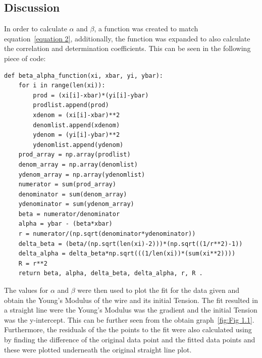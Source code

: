 \documentclass[12pt, a4paper]{article}
\begin{document}
\subsection{Discussion}
In order to calculate \(\alpha\) and \(\beta\), a function was created to match equation~\ref{equation 2}, additionally, the function was expanded to also calculate the correlation and determination coefficients. This can be seen in the following piece of code:
\begin{verbatim}
def beta_alpha_function(xi, xbar, yi, ybar):
    for i in range(len(xi)):
        prod = (xi[i]-xbar)*(yi[i]-ybar)
        prodlist.append(prod)
        xdenom = (xi[i]-xbar)**2
        denomlist.append(xdenom)
        ydenom = (yi[i]-ybar)**2
        ydenomlist.append(ydenom)
    prod_array = np.array(prodlist)
    denom_array = np.array(denomlist)
    ydenom_array = np.array(ydenomlist)
    numerator = sum(prod_array)
    denominator = sum(denom_array)
    ydenominator = sum(ydenom_array)
    beta = numerator/denominator
    alpha = ybar - (beta*xbar)
    r = numerator/(np.sqrt(denominator*ydenominator))
    delta_beta = (beta/(np.sqrt(len(xi)-2)))*(np.sqrt((1/r**2)-1))
    delta_alpha = delta_beta*np.sqrt(((1/len(xi))*(sum(xi**2))))
    R = r**2
    return beta, alpha, delta_beta, delta_alpha, r, R .
\end{verbatim}
The values for \(\alpha\) and \(\beta\) were then used to plot the fit for the data given and obtain the Young's Modulus of the wire and its initial Tension. The fit resulted in a straight line were the Young's Modulus was the gradient and the initial Tension was the y-intercept. This can be further seen from the obtain graph~\ref{fig:Fig 1.1}. Furthermore, the residuals of the the points to the fit were also calculated using by finding the difference of the original data point and the fitted data points and these were plotted underneath the original straight line plot. 
\end{document}
